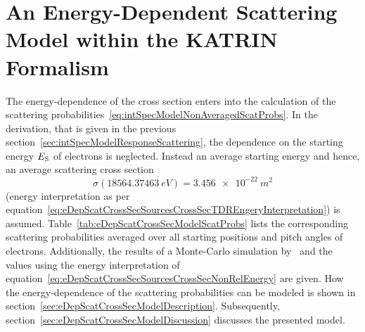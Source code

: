 \section{An Energy-Dependent Scattering Model within the KATRIN Formalism}
\label{sec:eDepScatCrossSecModel}
The energy-dependence of the cross section enters into the calculation of the scattering probabilities~\eqref{eq:intSpecModelNonAveragedScatProbs}. In the derivation, that is given in the previous section~\ref{sec:intSpecModelResponseScattering}, the dependence on the starting energy $E_\mathrm{S}$ of electrons is neglected. Instead an average starting energy and hence, an average scattering cross section
\begin{equation}
	\label{eq:eDepScatCrossSecModelTRDCrossSec}
	\sigma(\SI{18564.37463}{eV})=\SI{3.456e-22}{m^2}
\end{equation}  (energy interpretation as per equation~\ref{eq:eDepScatCrossSecSourcesCrossSecTDREngeryInterpretation}) is assumed. Table~\ref{tab:eDepScatCrossSecModelScatProbs} lists the corresponding scattering probabilities averaged over all starting positions and pitch angles of electrons. Additionally, the results of a Monte-Carlo simulation by~\cite{Groh2015} and the values using the energy interpretation of equation~\eqref{eq:eDepScatCrossSecSourcesCrossSecNonRelEnergy} are given. How the energy-dependence of the scattering probabilities can be modeled is shown in section~\ref{sec:eDepScatCrossSecModelDescription}.  Subsequently, section~\ref{sec:eDepScatCrossSecModelDiscussion} discusses the presented model.

